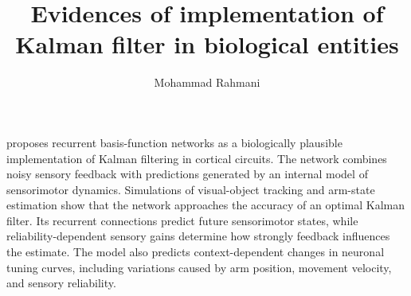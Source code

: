 \documentclass[a4paper]{article}
\title{Evidences of implementation of Kalman filter in biological entities}
\date{}
\author{Mohammad Rahmani}
\begin{document}
    \maketitle
    \cite{deneve-2007-optimal-sensorimotor-integration-in-recurrent-cortical-networks-a-neural-implementation-of-kalman-filters} proposes recurrent basis-function networks as a biologically plausible implementation of Kalman filtering in cortical circuits.
    The network combines noisy sensory feedback with predictions generated by an internal model of sensorimotor dynamics.
    Simulations of visual-object tracking and arm-state estimation show that the network approaches the accuracy of an optimal Kalman filter.
    Its recurrent connections predict future sensorimotor states, while reliability-dependent sensory gains determine how strongly feedback influences the estimate.
    The model also predicts context-dependent changes in neuronal tuning curves, including variations caused by arm position, movement velocity, and sensory reliability.
    
    
\end{document}
